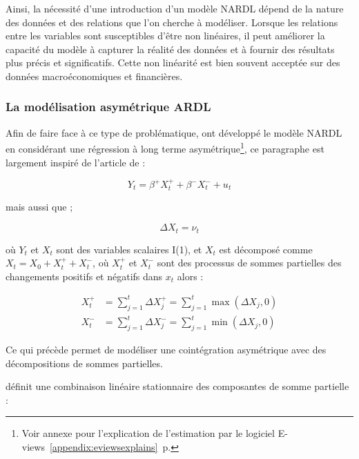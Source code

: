 Ainsi, la nécessité d'une introduction d'un modèle NARDL dépend de la nature des données et des relations que l'on cherche à modéliser. Lorsque les relations entre les variables sont susceptibles d'être non linéaires, il peut améliorer la capacité du modèle à capturer la réalité des données et à fournir des résultats plus précis et significatifs. Cette non linéarité est bien souvent acceptée sur des données macroéconomiques et financières.\\


\subsubsection{\textsf{La modélisation asymétrique ARDL}}

Afin de faire face à ce type de problématique, \cite{Shin} ont développé le modèle NARDL en considérant une régression à long terme asymétrique\footnote{Voir annexe pour l'explication de l'estimation par le logiciel E-views~\ref{appendix:eviewsexplains}~p.\pageref{appendix:eviewsexplains}}, ce paragraphe est largement inspiré de l'article de \cite{Allen et McAleer} :

\begin{equation}
   Y_t = \beta^+ X_t^+ + \beta^- X_t^- + u_t  
\end{equation}

mais aussi que ;

\begin{equation}
    \Delta X_t = \nu_t
\end{equation}

où \( Y_t \) et \( X_t \) sont des variables scalaires I(1), et \( X_t \) est décomposé comme \( X_t = X_0 + X_t^+ + X_t^- \), où \( X_t^+ \) et \( X_t^- \) sont des processus de sommes partielles des changements positifs et négatifs dans $x_t$ alors : 

\begin{equation}
    \begin{split}
      X_t^+ &= \sum_{j=1}^t \Delta X_j^+ = \sum_{j=1}^t \max (\Delta X_j, 0) \\
      X_t^- &= \sum_{j=1}^t \Delta X_j^- = \sum_{j=1}^t \min (\Delta X_j, 0)
    \end{split}
\end{equation}

Ce qui précède permet de modéliser une cointégration asymétrique avec des décompositions de sommes partielles.

\cite{Schorderet} définit une combinaison linéaire stationnaire des composantes de somme partielle :

